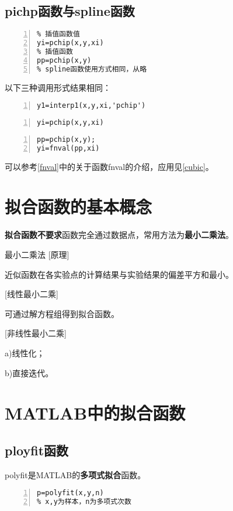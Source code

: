 \subsection{pichp函数与spline函数}\label{spline}
\begin{lstlisting}[frame=single,numbers=left]
% 调用格式
% 插值函数值
yi=pchip(x,y,xi)
% 插值函数
pp=pchip(x,y)
% spline函数使用方式相同，从略
\end{lstlisting}

以下三种调用形式结果相同：
\begin{lstlisting}[frame=single,numbers=left]
y1=interp1(x,y,xi,'pchip')
\end{lstlisting}
\begin{lstlisting}[frame=single,numbers=left]
yi=pchip(x,y,xi)
\end{lstlisting}
\begin{lstlisting}[frame=single,numbers=left]
pp=pchip(x,y);
yi=fnval(pp,xi)
\end{lstlisting}

\begin{note}
可以参考\ref{fnval}中的关于函数fnval的介绍，应用见\ref{cubic}。
\end{note}

\newpage
\section{拟合函数的基本概念}
\textcolor{third}{\textbf{拟合函数}}\textbf{不要求}函数完全通过数据点，常用方法为\textbf{最小二乘法}。

\begin{definition}{最小二乘法}{}
[原理]

近似函数在各实验点的计算结果与实验结果的偏差平方和最小。

[线性最小二乘]

可通过解方程组得到拟合函数。

[非线性最小二乘]

a)线性化；

b)直接迭代。
\end{definition}
\section{MATLAB中的拟合函数}\label{fit}
\subsection{ployfit函数}
polyfit是MATLAB的\textcolor{third}{\textbf{多项式拟合}}函数。
\begin{lstlisting}[frame=single,numbers=left]
% 调用格式
p=polyfit(x,y,n)
% x,y为样本，n为多项式次数
\end{lstlisting}

